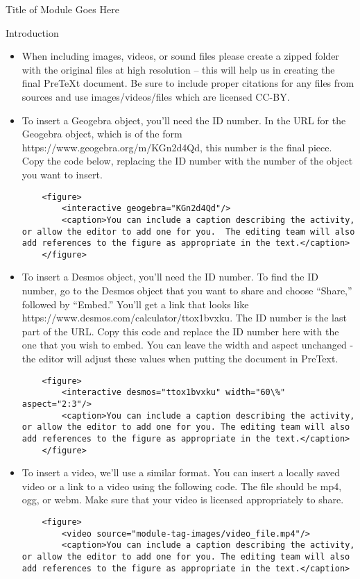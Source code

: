 \documentclass[oneside,10pt]{book}
\begin{document}
\begin{chapter}{Title of Module Goes Here}
\begin{section}{Introduction}
\begin{itemize}
\item When including images, videos, or sound files please create a zipped folder with the original files at high resolution – this will help us in creating the final PreTeXt document.  Be sure to include proper citations for any files from sources and use images/videos/files which are licensed CC-BY.
\item To insert a Geogebra object, you'll need the ID number.  In the URL for the Geogebra object, which is of the form https://www.geogebra.org/m/KGn2d4Qd, this number is the final piece.  Copy the code below, replacing the ID number with the number of the object you want to insert.
\begin{verbatim}
	<figure>
		<interactive geogebra="KGn2d4Qd"/>
		<caption>You can include a caption describing the activity, or allow the editor to add one for you.  The editing team will also add references to the figure as appropriate in the text.</caption>
	</figure>
\end{verbatim}
\item To insert a Desmos object, you'll need the ID number.  To find the ID number, go to the Desmos object that you want to share and choose ``Share,'' followed by ``Embed.''  You'll get a link that looks like https://www.desmos.com/calculator/ttox1bvxku.  The ID number is the last part of the URL.  Copy this code and replace the ID number here with the one that you wish to embed.  You can leave the width and aspect unchanged - the editor will adjust these values when putting the document in PreText.
\begin{verbatim}
	<figure>
		<interactive desmos="ttox1bvxku" width="60\%" aspect="2:3"/>
		<caption>You can include a caption describing the activity, or allow the editor to add one for you. The editing team will also add references to the figure as appropriate in the text.</caption>
	</figure>
\end{verbatim}
\item To insert a video, we'll use a similar format.  You can insert a locally saved video or a link to a video using the following code.  The file should be mp4, ogg, or webm.  Make sure that your video is licensed appropriately to share.
\begin{verbatim}
	<figure>
		<video source="module-tag-images/video_file.mp4"/>
		<caption>You can include a caption describing the activity, or allow the editor to add one for you. The editing team will also add references to the figure as appropriate in the text.</caption>

\end{verbatim}
\end{itemize}
\end{section}
\end{chapter}
\end{document}
